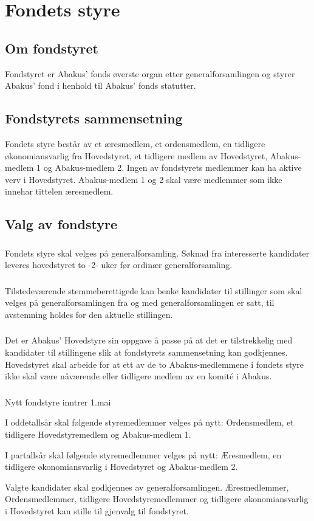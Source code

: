 \section{Fondets styre}
\subsection{Om fondstyret}
Fondstyret er Abakus’ fonds øverste organ etter generalforsamlingen og styrer
Abakus’ fond i henhold til Abakus’ fonds statutter.

\subsection{Fondstyrets sammensetning}
Fondets styre består av et æresmedlem, et ordensmedlem, en tidligere økonomiansvarlig fra
Hovedstyret, et tidligere medlem av Hovedstyret, Abakus-medlem 1 og Abakus-medlem 2.
Ingen av fondstyrets medlemmer kan ha aktive verv i Hovedstyret. Abakus-medlem 1 og 2 skal
være medlemmer som ikke innehar tittelen æresmedlem.

\subsection{Valg av fondstyre}
\subsubsection{}
Fondets styre skal velges på generalforsamling. Søknad fra interesserte kandidater
leveres hovedstyret to -2- uker før ordinær generalforsamling.

\subsubsection{}
Tilstedeværende stemmeberettigede kan benke kandidater til stillinger som skal velges
på generalforsamlingen fra og med generalforsamlingen er satt, til avstemning holdes for
den aktuelle stillingen.

\subsubsection{}
Det er Abakus’ Hovedstyre sin oppgave å passe på at det er tilstrekkelig med kandidater til
stillingene slik at fondstyrets sammensetning kan godkjennes. Hovedstyret skal arbeide for
at ett av de to Abakus-medlemmene i fondets styre ikke skal være nåværende eller tidligere
medlem av en komité i Abakus.

\subsubsection{}
Nytt fondstyre inntrer 1.mai

I oddetallsår skal følgende styremedlemmer velges på nytt: Ordensmedlem, et tidligere
Hovedstyremedlem og Abakus-medlem 1.

I partallsår skal følgende styremedlemmer velges på nytt: Æresmedlem, en tidligere
økonomiansvarlig i Hovedstyret og Abakus-medlem 2.

Valgte kandidater skal godkjennes av generalforsamlingen. Æresmedlemmer, Ordensmedlemmer,
tidligere Hovedstyremedlemmer og tidligere økonomiansvarlig i Hovedstyret kan
stille til gjenvalg til fondstyret.
